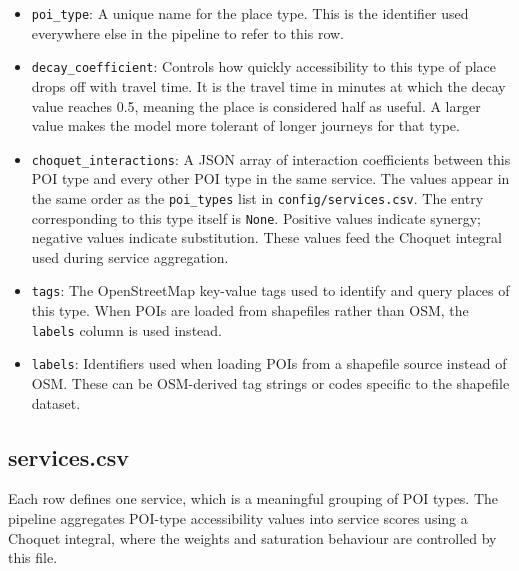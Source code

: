 \documentclass[11pt]{article}
\begin{document}
\begin{itemize}
  \item \texttt{poi\_type}: A unique name for the place type. This is the identifier used everywhere else in the pipeline to refer to this row.
  \item \texttt{decay\_coefficient}: Controls how quickly accessibility to this type of place drops off with travel time. It is the travel time in minutes at which the decay value reaches 0.5, meaning the place is considered half as useful. A larger value makes the model more tolerant of longer journeys for that type.
  \item \texttt{choquet\_interactions}: A JSON array of interaction coefficients between this POI type and every other POI type in the same service. The values appear in the same order as the \texttt{poi\_types} list in \texttt{config/services.csv}. The entry corresponding to this type itself is \texttt{None}. Positive values indicate synergy; negative values indicate substitution. These values feed the Choquet integral used during service aggregation.
  \item \texttt{tags}: The OpenStreetMap key-value tags used to identify and query places of this type. When POIs are loaded from shapefiles rather than OSM, the \texttt{labels} column is used instead.
  \item \texttt{labels}: Identifiers used when loading POIs from a shapefile source instead of OSM. These can be OSM-derived tag strings or codes specific to the shapefile dataset.
\end{itemize}

\subsection*{services.csv}

Each row defines one service, which is a meaningful grouping of POI types. The pipeline aggregates POI-type accessibility values into service scores using a Choquet integral, where the weights and saturation behaviour are controlled by this file.
\end{document}
